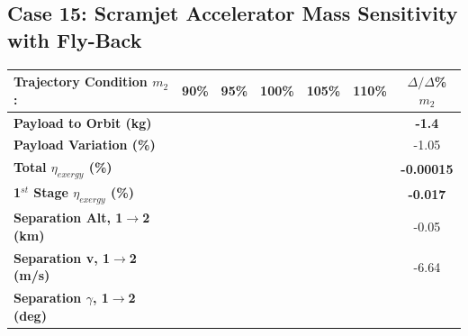 \subsection{Case 15: Scramjet Accelerator Mass Sensitivity with Fly-Back}\label{sec:m2var}


\begin{table}[ht] %
\centering
\begin{tabular}{l c c c c c c} 
	\hline \textbf{Trajectory Condition}   \qquad  $m_{2}$:
	&90\%
	&95\%
	&100\%
	&105\%
	&110\%
	& $\Delta/\Delta$\%$m_{2}$
	\\
	\hline \textbf{Payload to Orbit (kg)}
	& \textbf{\PayloadToOrbitmSPARTANNinety}
	& \textbf{\PayloadToOrbitmSPARTANNinetyFive}
	& \textbf{\PayloadToOrbitmSPARTANStandard}
	& \textbf{\PayloadToOrbitmSPARTANOneHundredFive}
	& \textbf{\PayloadToOrbitmSPARTANOneHundredTen}
	&\textbf{-1.4}
	\\
	\textbf{Payload Variation (\%)}
	& \PayloadVarmSPARTANNinety
	& \PayloadVarmSPARTANNinetyFive
	& \PayloadVarmSPARTANStandard
	& \PayloadVarmSPARTANOneHundredFive
	& \PayloadVarmSPARTANOneHundredTen
	&-1.05
	\\
	\textbf{Total $\eta_{exergy}$ (\%)}
	& \textbf{\totalExergyEffmSPARTANNinety}
	& \textbf{\totalExergyEffmSPARTANNinetyFive}
	& \textbf{\totalExergyEffmSPARTANStandard}
	& \textbf{\totalExergyEffmSPARTANOneHundredFive}
	& \textbf{\totalExergyEffmSPARTANOneHundredTen}
	& \textbf{-0.00015}
	\\
	\hline 
	\textbf{1$^{st}$ Stage $\eta_{exergy}$ (\%)}
	& \textbf{\firstExergyEffmSPARTANNinety}
	& \textbf{\firstExergyEffmSPARTANNinetyFive}
	& \textbf{\firstExergyEffmSPARTANStandard}
	& \textbf{\firstExergyEffmSPARTANOneHundredFive}
	& \textbf{\firstExergyEffmSPARTANOneHundredTen}
	& \textbf{-0.017}
	\\
	\textbf{Separation Alt, 1$\rightarrow$2 (km)}
	& \firstsecondSeparationAltmSPARTANNinety
	& \firstsecondSeparationAltmSPARTANNinetyFive
	& \firstsecondSeparationAltmSPARTANStandard
	& \firstsecondSeparationAltmSPARTANOneHundredFive
	& \firstsecondSeparationAltmSPARTANOneHundredTen
	&-0.05
	\\
	\textbf{Separation v, 1$\rightarrow$2 (m/s)}
	& \firstsecondSeparationvmSPARTANNinety
	& \firstsecondSeparationvmSPARTANNinetyFive
	& \firstsecondSeparationvmSPARTANStandard
	& \firstsecondSeparationvmSPARTANOneHundredFive
	& \firstsecondSeparationvmSPARTANOneHundredTen
	&-6.64
	\\
	\textbf{Separation $\gamma$, 1$\rightarrow$2 (deg)}
	& \firstsecondSeparationgammamSPARTANNinety

\end{tabular}
\end{table}
